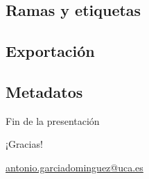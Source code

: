 \documentclass[xcolor=svgnames]{beamer}
\begin{document}
\subsection{Ramas y etiquetas}

\subsection{Exportación}

\subsection{Metadatos}

\appendix

\begin{frame}{Fin de la presentación}
  \begin{center}
    {\Huge ¡Gracias!}

    \vspace{3em}

    {\Large
      \href{mailto:antonio.garciadominguez@uca.es}{antonio.garciadominguez@uca.es}}
  \end{center}
\end{frame}
\end{document}
